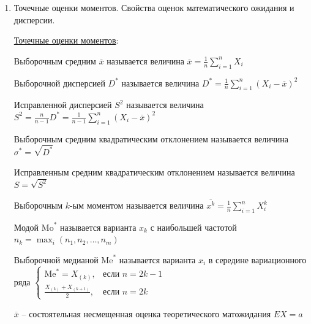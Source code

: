 \begin{enumerate}
    \Defs Оценка $\theta^*$ называется \textbf{эффективной}, если она не хуже всех остальных оценок

    \Notas Не существует эффективной оценки в классе всех возможных оценок

    \begin{MyTheorem}
        \Ths В классе несмещенных оценок существует эффективная оценка
    \end{MyTheorem}

    \Defs Оценка $\theta^*$ параметра $\theta$ называется асимптотически нормальной, если 
    $\sqrt{n} (\theta^* - \theta) \rightrightarrows N(0, \sigma^2 (\theta))$ при $n \to \infty$

    \item Точечные оценки моментов. Свойства оценок математического ожидания и дисперсии.

    \hyperlink{moments_point_estimation}{Точечные оценки моментов}:

    \Defs Выборочным средним $\overline{x}$ называется величина $\overline{x} = \frac{1}{n} \sum_{i = 1}^n X_i$

    \Defs Выборочной дисперсией $D^*$ называется величина $D^* = \frac{1}{n} \sum_{i = 1}^n (X_i - \overline{x})^2$

    \Defs Исправленной дисперсией $S^2$ называется величина $S^2 = \frac{n}{n - 1} D^* = \frac{1}{n - 1} \sum_{i = 1}^n (X_i - \overline{x})^2$

    \Defs Выборочным средним квадратическим отклонением называется величина $\sigma^* = \sqrt{D^*}$

    \Defs Исправленным средним квадратическим отклонением называется величина $S = \sqrt{S^2}$

    \Defs Выборочным $k$-ым моментом называется величина $\overline{x^k} = \frac{1}{n} \sum_{i = 1}^n X_i^k$

    \Defs Модой $\mathrm{Mo}^*$ называется варианта $x_k$ с наибольшей частотой $n_k = \max_i (n_1, n_2, \dots, n_m)$

    \Defs Выборочной медианой $\mathrm{Me}^*$ называется варианта $x_i$ в середине вариационного ряда $\begin{cases}\mathrm{Me}^* = 
    X_{(k)}, & \text{если } n = 2k - 1 \\ \frac{X_{(k)} + X_{(k + 1)}}{2}, & \text{если } n = 2k\end{cases}$
    
    \begin{MyTheorem}
        \Ths $\overline{x}$ -- состоятельная несмещенная оценка теоретического матожидания $EX = a$
    

\end{MyTheorem}
\end{enumerate}

